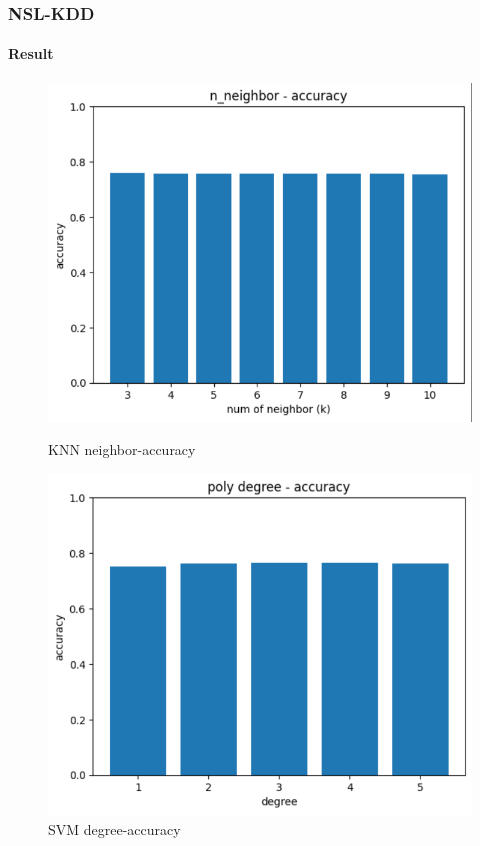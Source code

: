 \documentclass[
	11pt, %
	aspectratio=169, %
]{beamer}
\begin{document}
\begin{frame}
	\frametitle{NSL-KDD}
	\framesubtitle{Result}

	\begin{figure}[htbp]
		\begin{minipage}[t]{0.48\textwidth}
			\includegraphics[width=1.0\linewidth]{knn_neighbor.png}
			\caption{KNN neighbor-accuracy}
		\end{minipage}
		\begin{minipage}[t]{0.48\textwidth}
			\includegraphics[width=1.0\linewidth]{svm_poly_degree.png}
			\caption{SVM degree-accuracy}
		\end{minipage}
	\end{figure}
\end{frame}
\end{document}
